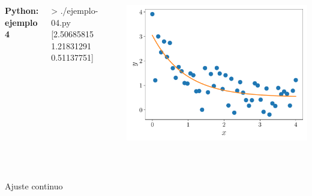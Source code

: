 \documentclass[9pt, aspectratio=169]{beamer}
\begin{document}
\begin{frame}[fragile]
	\begin{columns}

		\textbf{Python: ejemplo 4}

		\begin{shell}
			> ./ejemplo-04.py
			[2.50685815 1.21831291 0.51137751]
		\end{shell}

		\cx
		\begin{center}
			\includegraphics[scale=0.40]{code/ejem-04.pdf}
		\end{center}
	\end{columns}
\end{frame}

\begin{frame}[standout]\
	\begin{center}
		{\Huge Ajuste continuo}
	\end{center}
\end{frame}
\end{document}
